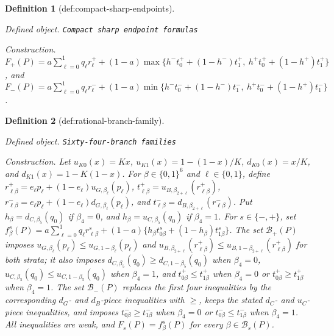\documentclass{article}
\newtheorem{definition}{Definition}
\begin{document}
\begin{definition}[def:compact-sharp-endpoints]\label{def:compact-sharp-endpoints}
\par\smallskip\noindent\emph{Defined object.} \texttt{Compact sharp endpoint formulas}
\par\smallskip\noindent\emph{Construction.} \(F_+(P)=a\sum_{\ell=0}^1q_\ell r_\ell^+ +(1-a)\max\{h^-t_0^++(1-h^-)t_1^+,\ h^+t_0^++(1-h^+)t_1^+\}\), and \(F_-(P)=a\sum_{\ell=0}^1q_\ell r_\ell^- +(1-a)\min\{h^-t_0^-+(1-h^-)t_1^-,\ h^+t_0^-+(1-h^+)t_1^-\}\).
\end{definition}

\begin{definition}[def:rational-branch-family]\label{def:rational-branch-family}
\par\smallskip\noindent\emph{Defined object.} \texttt{Sixty-\allowbreak{}four-\allowbreak{}branch families}
\par\smallskip\noindent\emph{Construction.} Let \(u_{K0}(x)=Kx\), \(u_{K1}(x)=1-(1-x)/K\), \(d_{K0}(x)=x/K\), and \(d_{K1}(x)=1-K(1-x)\). For \(\beta\in\{0,1\}^6\) and \(\ell\in\{0,1\}\), define \(r_{\ell\beta}^+=e_\ell p_\ell+(1-e_\ell)u_{G,\beta_\ell}(p_\ell)\), \(t_{\ell\beta}^+=u_{B,\beta_{2+\ell}}(r_{\ell\beta}^+)\), \(r_{\ell\beta}^-=e_\ell p_\ell+(1-e_\ell)d_{G,\beta_\ell}(p_\ell)\), and \(t_{\ell\beta}^-=d_{B,\beta_{2+\ell}}(r_{\ell\beta}^-)\). Put \(h_\beta=d_{C,\beta_5}(q_0)\) if \(\beta_4=0\), and \(h_\beta=u_{C,\beta_5}(q_0)\) if \(\beta_4=1\). For \(s\in\{-,+\}\), set \(f_\beta^s(P)=a\sum_{\ell=0}^1q_\ell r_{\ell\beta}^s+(1-a)\{h_\beta t_{0\beta}^s+(1-h_\beta)t_{1\beta}^s\}\). The set \(\mathcal B_+(P)\) imposes \(u_{G,\beta_\ell}(p_\ell)\leq u_{G,1-\beta_\ell}(p_\ell)\) and \(u_{B,\beta_{2+\ell}}(r_{\ell\beta}^+)\leq u_{B,1-\beta_{2+\ell}}(r_{\ell\beta}^+)\) for both strata; it also imposes \(d_{C,\beta_5}(q_0)\geq d_{C,1-\beta_5}(q_0)\) when \(\beta_4=0\), \(u_{C,\beta_5}(q_0)\leq u_{C,1-\beta_5}(q_0)\) when \(\beta_4=1\), and \(t_{0\beta}^+\leq t_{1\beta}^+\) when \(\beta_4=0\) or \(t_{0\beta}^+\geq t_{1\beta}^+\) when \(\beta_4=1\). The set \(\mathcal B_-(P)\) replaces the first four inequalities by the corresponding \(d_G\)- and \(d_B\)-piece inequalities with \(\geq\), keeps the stated \(d_C\)- and \(u_C\)-piece inequalities, and imposes \(t_{0\beta}^-\geq t_{1\beta}^-\) when \(\beta_4=0\) or \(t_{0\beta}^-\leq t_{1\beta}^-\) when \(\beta_4=1\). All inequalities are weak, and \(F_s(P)=f_\beta^s(P)\) for every \(\beta\in\mathcal B_s(P)\).
\end{definition}
\end{document}
